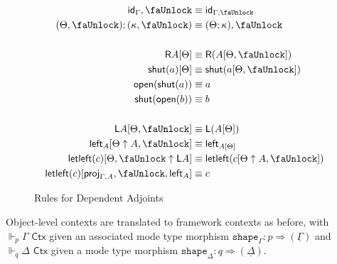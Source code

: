 \documentclass[10pt]{article}
\theoremstyle{definition}
\newcommand{\tcell}{\Rightarrow}
\newcommand{\CTX}{\,\,\mathsf{Ctx}}
\newcommand{\TYPE}{\,\,\mathsf{Type}}
\newcommand{\id}{\mathsf{id}}
\newcommand\ctxtuple[1]{(#1)}
\newcommand{\tshape}[1]{\ensuremath{\mathtt{shape}_{#1}}}
\newcommand{\qyields}{\Vdash}
\newcommand{\downstairs}[1]{\underline{#1}}
\newcommand\proj[1]{\ensuremath{\mathsf{proj}_{#1}}}
\newcommand{\lock}{\text{\faUnlock}}
\newcommand{\Rtype}[1]{\mathsf{R}{#1}}
\newcommand{\RI}[1]{\mathsf{shut}({#1})}
\newcommand{\RE}[1]{\mathsf{open}({#1})}
\newcommand{\Ltype}[1]{\mathsf{L}{#1}}
\newcommand{\LI}[1]{\mathsf{left}_{#1}}
\newcommand{\LE}[1]{\mathsf{letleft}({#1})}
\begin{document}
\begin{figure}
\begin{align}
\id_\Gamma , \lock &\equiv \id_{\Gamma, \lock} \\
(\Theta, \lock) ; (\kappa, \lock) &\equiv (\Theta ; \kappa), \lock \\
\nonumber \\
\Rtype{A}[\Theta] &\equiv \Rtype{(A[\Theta, \lock])} \\
\RI{a}[\Theta] &\equiv \RI{a[\Theta, \lock]} \\
\RE{\RI{a}} &\equiv a \\
\RI{\RE{b}} &\equiv b \\
\nonumber \\
\Ltype{A}[\Theta, \lock] &\equiv \Ltype{(A[\Theta])} \\
\LI{A}[\Theta \uparrow A, \lock] &\equiv \LI{A[\Theta]} \\
\LE{c}[\Theta, \lock \uparrow \Ltype{A}] &\equiv \LE{c[\Theta \uparrow A, \lock]} \\
\LE{c}[\proj{\Gamma, A}, \lock, \LI{A}] &\equiv c
\end{align}
\caption{Rules for Dependent Adjoints}\label{fig:qit-adjoint-rules}
\end{figure}

Object-level contexts are translated to framework contexts as before,
with $\qyields_p \Gamma \CTX$ given an associated mode type morphism
$\tshape{\Gamma} : p \tcell \ctxtuple{\downstairs{\Gamma}}$ and
$\qyields_q \Delta \CTX$ given a mode type morphism $\tshape{\Delta} : q
\tcell \ctxtuple{\downstairs{\Delta}}$.
\end{document}
